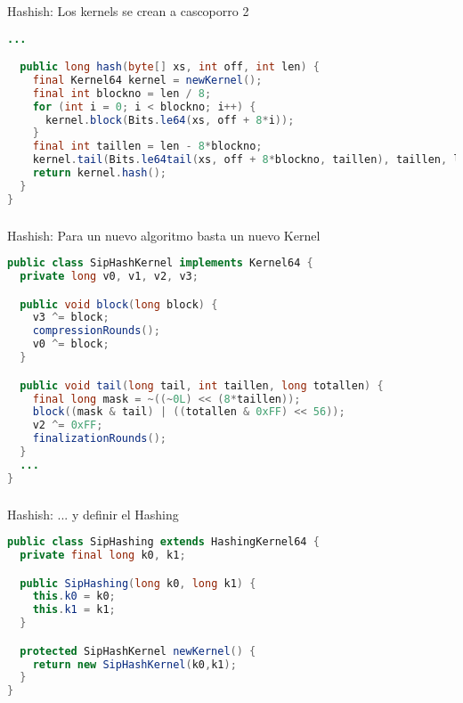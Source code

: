 \begin{frame}[fragile]
  \frametitle{\ft}
  \begin{block}{Hashish: Los kernels se crean a cascoporro 2}
    \begin{lstlisting}[language=java]
  ...

  public long hash(byte[] xs, int off, int len) {
    final Kernel64 kernel = newKernel();
    final int blockno = len / 8;
    for (int i = 0; i < blockno; i++) {
      kernel.block(Bits.le64(xs, off + 8*i));
    }
    final int taillen = len - 8*blockno;
    kernel.tail(Bits.le64tail(xs, off + 8*blockno, taillen), taillen, len);
    return kernel.hash();
  }
}
    \end{lstlisting}
  \end{block}
\end{frame}


\begin{frame}[fragile]
  \frametitle{\ft}
  \begin{block}{Hashish: Para un nuevo algoritmo basta un nuevo Kernel}
    \begin{lstlisting}[language=java]
public class SipHashKernel implements Kernel64 {
  private long v0, v1, v2, v3;

  public void block(long block) {
    v3 ^= block;
    compressionRounds();
    v0 ^= block;
  }

  public void tail(long tail, int taillen, long totallen) {
    final long mask = ~((~0L) << (8*taillen));
    block((mask & tail) | ((totallen & 0xFF) << 56));
    v2 ^= 0xFF;
    finalizationRounds();
  }
  ...
}
    \end{lstlisting}
  \end{block}
\end{frame}


\begin{frame}[fragile]
  \frametitle{\ft}
  \begin{block}{Hashish: ... y definir el Hashing}
    \begin{lstlisting}[language=java]
public class SipHashing extends HashingKernel64 {
  private final long k0, k1;

  public SipHashing(long k0, long k1) {
    this.k0 = k0;
    this.k1 = k1;
  }

  protected SipHashKernel newKernel() {
    return new SipHashKernel(k0,k1);
  }
}
    \end{lstlisting}
  \end{block}
\end{frame}


